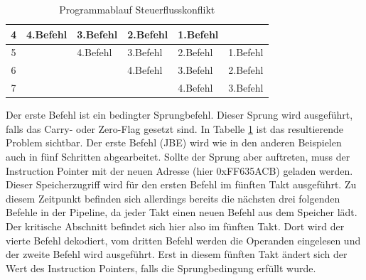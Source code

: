 \documentclass[12pt]{article}
\begin{document}
\begin{table}[]
\begin{tabular}{|c|l|l|l|l|l|}
4             & \cellcolor[HTML]{FFFE65}4.Befehl                                                        & \cellcolor[HTML]{67FD9A}3.Befehl                                                           & \cellcolor[HTML]{38FFF8}2.Befehl                                                            & \cellcolor[HTML]{9698ED}1.Befehl        &                                                                                               \\ \hline
5             & \cellcolor[HTML]{FFFFFF}                                                                & \cellcolor[HTML]{FFFE65}4.Befehl                                                           & \cellcolor[HTML]{67FD9A}3.Befehl                                                            & \cellcolor[HTML]{38FFF8}2.Befehl        & \cellcolor[HTML]{9698ED}1.Befehl                                                              \\ \hline
6             &                                                                                         & \cellcolor[HTML]{FFFFFF}                                                                   & \cellcolor[HTML]{FFFE65}4.Befehl                                                            & \cellcolor[HTML]{67FD9A}3.Befehl        & \cellcolor[HTML]{38FFF8}2.Befehl                                                              \\ \hline
7             &                                                                                         &                                                                                            & \cellcolor[HTML]{FFFFFF}                                                                    & \cellcolor[HTML]{FFFE65}4.Befehl        & \cellcolor[HTML]{67FD9A}3.Befehl                                                              \\ \hline
\end{tabular}
\caption{Programmablauf Steuerflusskonflikt}
\label{tab:Steuerflusskonflikt}

\end{table}

\noindent Der erste Befehl ist ein bedingter Sprungbefehl. Dieser Sprung wird ausgeführt, falls das Carry- oder Zero-Flag gesetzt sind. In Tabelle \ref{tab:Steuerflusskonflikt} ist das resultierende Problem sichtbar. Der erste Befehl (JBE) wird wie in den anderen Beispielen auch in fünf Schritten abgearbeitet. Sollte der Sprung aber auftreten, muss der Instruction Pointer mit der neuen Adresse (hier 0xFF635ACB) geladen werden. Dieser Speicherzugriff wird für den ersten Befehl im fünften Takt ausgeführt. Zu diesem Zeitpunkt befinden sich allerdings bereits die nächsten drei folgenden Befehle in der Pipeline, da jeder Takt einen neuen Befehl aus dem Speicher lädt. Der kritische Abschnitt befindet sich hier also im fünften Takt. Dort wird der vierte Befehl dekodiert, vom dritten Befehl werden die Operanden eingelesen und der zweite Befehl wird ausgeführt. Erst in diesem fünften Takt ändert sich der Wert des Instruction Pointers, falls die Sprungbedingung erfüllt wurde. 
\end{document}
